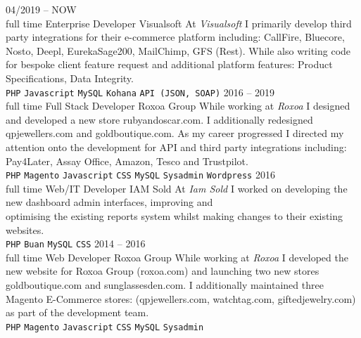 \documentclass[9pt]{cv}
\begin{document}


\begin{entrylist}
	\entry
		{04/2019 -- NOW\\\footnotesize{full time}}
		{Enterprise Developer}
		{Visualsoft}
		{At \textit{Visualsoft} I primarily develop third party integrations for their e-commerce platform including: CallFire, Bluecore, Nosto, Deepl, EurekaSage200, MailChimp, GFS (Rest). While also writing code for bespoke client feature request and additional platform features: Product Specifications, Data Integrity.\\
		\texttt{PHP}\slashsep
		\texttt{Javascript}\slashsep
		\texttt{MySQL}\slashsep
		\texttt{Kohana}\slashsep
		\texttt{API (JSON, SOAP)}}
	\entry
		{2016 -- 2019\\\footnotesize{full time}}
		{Full Stack Developer}
		{Roxoa Group}
		{While working at \textit{Roxoa} I designed and developed a new store rubyandoscar.com. I additionally redesigned qpjewellers.com and goldboutique.com. As my career progressed I directed my attention onto the development for API and third party integrations including: Pay4Later, Assay Office, Amazon, Tesco and Trustpilot.\\
		\texttt{PHP}\slashsep
		\texttt{Magento}\slashsep
		\texttt{Javascript}\slashsep
		\texttt{CSS}\slashsep
		\texttt{MySQL}\slashsep
		\texttt{Sysadmin}\slashsep
		\texttt{Wordpress}}
	\entry
		{2016\\\footnotesize{full time}}
		{Web/IT Developer}
		{IAM Sold}
		{At \textit{Iam Sold} I worked on developing the new dashboard admin interfaces, improving and \\optimising the existing reports system whilst making changes to their existing websites.\\
		\texttt{PHP}\slashsep
		\texttt{Buan}\slashsep
		\texttt{MySQL}\slashsep
		\texttt{CSS}}
	\entry
		{2014 -- 2016\\\footnotesize{full time}}
		{Web Developer}
		{Roxoa Group}
		{While working at \textit{Roxoa} I developed the new website for Roxoa Group (roxoa.com) and launching two new stores goldboutique.com and sunglassesden.com. I additionally maintained three Magento E-Commerce stores: (qpjewellers.com, watchtag.com, giftedjewelry.com) as part of the development team.\\
		\texttt{PHP}\slashsep
		\texttt{Magento}\slashsep
		\texttt{Javascript}\slashsep
		\texttt{CSS}\slashsep
		\texttt{MySQL}\slashsep
		\texttt{Sysadmin}\slashsep
}
\end{entrylist}
\end{document}
